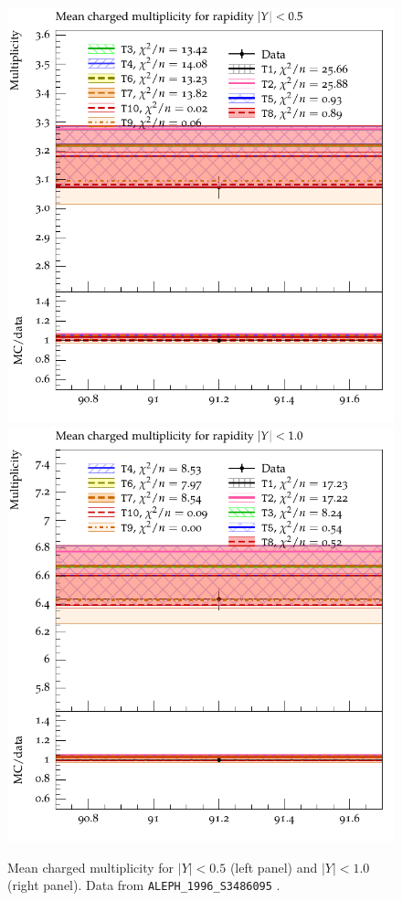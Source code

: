 \documentclass[aps,preprint,floatfix,nofootinbib,showpacs]{revtex4-1}
\begin{document}
\begin{figure}[!h]
\centering
\includegraphics[width=0.47\linewidth]{Figures/Mean_multiplicities/ALEPH_1996_S3486095_d20-x01-y01.pdf}
\hfill
\includegraphics[width=0.47\linewidth]{Figures/Mean_multiplicities/ALEPH_1996_S3486095_d21-x01-y01.pdf}
\caption{Mean charged multiplicity for $|Y|<0.5$ (left panel) and $|Y|<1.0$ (right panel). Data
from \texttt{ALEPH\_1996\_S3486095} \cite{Barate:1996fi}.}
\label{Fig.21}
\end{figure}
\end{document}
